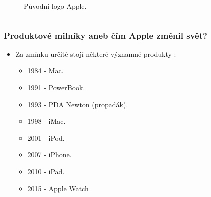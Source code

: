 \documentclass{beamer}
\begin{document}
\begin{frame}
\begin{itemize}
\begin{columns}
\begin{figure}[h]
	\begin{center}
	\caption{Původní logo Apple.}
	\label{logo2}
	\end{center}
	\end{figure}
\end{columns}
\end{itemize}
\end{frame}

\begin{frame}
\frametitle{Produktové milníky aneb čím Apple změnil svět?}
\begin{itemize}
 \item Za zmínku určitě stojí některé významné produkty \cite{MacWorld:30moments}:
 	\begin{itemize}
	\item 1984 - Mac.
	\item 1991 - PowerBook.
	\item 1993 - PDA Newton (propadák).
	\item 1998 - iMac.
	\item 2001 - iPod.
	\item 2007 - iPhone.
	\item 2010 - iPad.
	\item 2015 - Apple Watch
	\end{itemize}
\end{itemize}
\end{frame}
\end{document}
